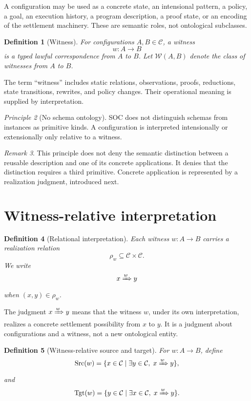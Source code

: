 \documentclass[11pt]{article}
\newtheorem{definition}{Definition}[section]
\theoremstyle{remark}
\newtheorem{remark}[definition]{Remark}
\newtheorem{principle}[definition]{Principle}
\newcommand{\Conf}{\mathcal{C}}
\newcommand{\Wit}{\mathcal{W}}
\newcommand{\realizes}[1]{\xRightarrow{#1}}
\begin{document}
A configuration may be used as a concrete state, an intensional pattern, a
policy, a goal, an execution history, a program description, a proof state, or
an encoding of the settlement machinery. These are semantic roles, not
ontological subclasses.

\begin{definition}[Witness]
For configurations $A,B\in\Conf$, a \emph{witness}
\[
  w:A\longrightarrow B
\]
is a typed lawful correspondence from $A$ to $B$. Let
$\Wit(A,B)$ denote the class of witnesses from $A$ to $B$.
\end{definition}

The term ``witness'' includes static relations, observations, proofs,
reductions, state transitions, rewrites, and policy changes. Their operational
meaning is supplied by interpretation.

\begin{principle}[No schema ontology]
SOC does not distinguish schemas from instances as primitive kinds. A
configuration is interpreted intensionally or extensionally only relative to a
witness.
\end{principle}

\begin{remark}
This principle does not deny the semantic distinction between a reusable
description and one of its concrete applications. It denies that the
distinction requires a third primitive. Concrete application is represented by
a realization judgment, introduced next.
\end{remark}

\section{Witness-relative interpretation}

\begin{definition}[Relational interpretation]
Each witness $w:A\to B$ carries a realization relation
\[
  \rho_w \subseteq \Conf\times\Conf.
\]
We write
\[
  x \realizes{w} y
\]
when $(x,y)\in\rho_w$.
\end{definition}

The judgment $x\realizes{w}y$ means that the witness $w$, under its own
interpretation, realizes a concrete settlement possibility from $x$ to $y$.
It is a judgment about configurations and a witness, not a new ontological
entity.

\begin{definition}[Witness-relative source and target]
For $w:A\to B$, define
\[
  \operatorname{Src}(w)
  =
  \{x\in\Conf\mid \exists y\in\Conf,\;x\realizes{w}y\},
\]
and
\[
  \operatorname{Tgt}(w)
  =
  \{y\in\Conf\mid \exists x\in\Conf,\;x\realizes{w}y\}.
\]
\end{definition}
\end{document}
